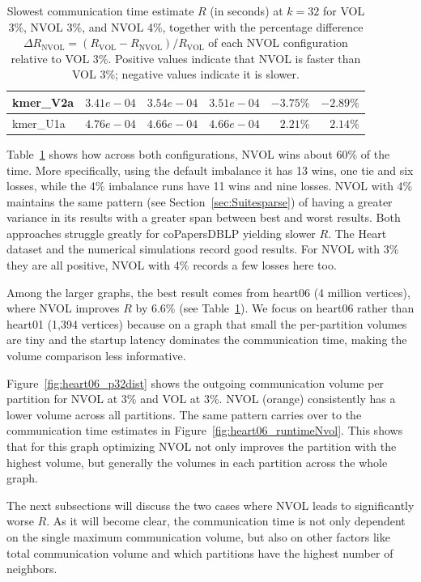 \begin{table}[h]
{\begin{tabular}{|l|r|r|r|r|r|}
		\hline
		kmer\_V2a & $3.41e-04$ & $3.54e-04$ & $3.51e-04$ & $-3.75\%$ & $-2.89\%$\\
		\hline
		kmer\_U1a & $4.76e-04$ & $4.66e-04$ & $4.66e-04$ & $2.21\%$ & $2.14\%$\\
		\hline
	\end{tabular}}
	\caption{Slowest communication time estimate $R$ (in seconds) at $k=32$ for VOL 3\%, NVOL 3\%, and NVOL 4\%, together with the percentage difference $\Delta R_{\mathrm{NVOL}} = (R_{\mathrm{VOL}} - R_{\mathrm{NVOL}})/ R_{\mathrm{VOL}}$ of each NVOL configuration relative to VOL 3\%. Positive values indicate that NVOL is faster than VOL 3\%; negative values indicate it is slower.}	
	\label{tab:runtime_NVOL_NVOL_4}
\end{table}

Table~\ref{tab:runtime_NVOL_NVOL_4} shows how across both configurations, NVOL wins about 60\% of the time. More specifically, using the default imbalance it has 13 wins, one tie and six losses, while the 4\% imbalance runs have 11 wins and nine losses. NVOL with 4\% maintains the same pattern (see Section~\ref{sec:Suitesparse}) of having a greater variance in its results with a greater span between best and worst results. Both approaches struggle greatly for coPapersDBLP yielding slower $R$. The Heart dataset and the numerical simulations record good results. For NVOL with 3\% they are all positive, NVOL with 4\% records a few losses here too. 

Among the larger graphs, the best result comes from heart06 (4 million vertices), where NVOL improves $R$ by 6.6\% (see Table~\ref{tab:runtime_NVOL_NVOL_4}). We focus on heart06 rather than heart01 (1,394 vertices) because on a graph that small the per-partition volumes are tiny and the startup latency dominates the communication time, making the volume comparison less informative.

Figure~\ref{fig:heart06_p32dist} shows the outgoing communication volume per partition for NVOL at 3\% and VOL at 3\%. NVOL (orange) consistently has a lower volume across all partitions. The same pattern carries over to the communication time estimates in Figure~\ref{fig:heart06_runtimeNvol}. This shows that for this graph optimizing NVOL not only improves the partition with the highest volume, but generally the volumes in each partition across the whole graph. 

The next subsections will discuss the two cases where NVOL leads to significantly worse $R$. As it will become clear, the communication time is not only dependent on the single maximum communication volume, but also on other factors like total communication volume and which partitions have the highest number of neighbors.

